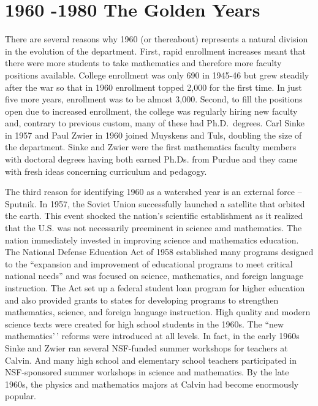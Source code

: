 \documentclass[
]{book}
\begin{document}
\hypertarget{the-golden-years}{%
\chapter{1960 -1980 The Golden Years}\label{the-golden-years}}

There are several reasons why 1960 (or thereabout) represents a natural division in the evolution of the department. First, rapid enrollment increases meant that there were more students to take mathematics and therefore more faculty positions available. College enrollment was only 690 in 1945-46 but grew steadily after the war so that in 1960 enrollment topped 2,000 for the first time. In just five more years, enrollment was to be almost 3,000. Second, to fill the positions open due to increased enrollment, the college was regularly hiring new faculty and, contrary to previous custom, many of these had Ph.D.~degrees. Carl Sinke in 1957 and Paul Zwier in 1960 joined Muyskens and Tuls, doubling the size of the department. Sinke and Zwier were the first mathematics faculty members with doctoral degrees having both earned Ph.Ds. from Purdue and they came with fresh ideas concerning curriculum and pedagogy.

The third reason for identifying 1960 as a watershed year is an external force -- Sputnik. In 1957, the Soviet Union successfully launched a satellite that orbited the earth. This event shocked the nation's scientific establishment as it realized that the U.S. was not necessarily preeminent in science amd mathematics. The nation immediately invested in improving science and mathematics education. The National Defense Education Act of 1958 established many programs designed to the ``expansion and improvement of educational programs to meet critical national needs'' and was focused on science, mathematics, and foreign language instruction. The Act set up a federal student loan program for higher education and also provided grants to states for developing programs to strengthen mathematics, science, and foreign language instruction. High quality and modern science texts were created for high school students in the 1960s. The ``new mathematics'\,' reforms were introduced at all levels. In fact, in the early 1960s Sinke and Zwier ran several NSF-funded summer workshops for teachers at Calvin. And many high school and elementary school teachers participated in NSF-sponsored summer workshops in science and mathematics. By the late 1960s, the physics and mathematics majors at Calvin had become enormously popular.
\end{document}
